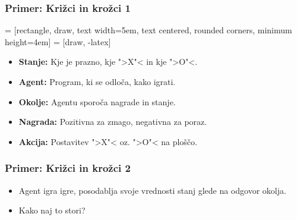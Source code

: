 \documentclass{beamer}    %
\begin{document}
\begin{frame}
    \frametitle{Primer: Križci in krožci 1}
     = [rectangle, draw, 
    text width=5em, text centered, rounded corners, minimum height=4em]
     = [draw, -latex]
    \begin{itemize}
        \item \textbf{Stanje:} Kje je prazno, kje ">X"< in kje ">O"<.
        \item \textbf{Agent:} Program, ki se odloča, kako igrati.
        \item \textbf{Okolje:} Agentu sporoča nagrade in stanje.
        \item \textbf{Nagrada:} Pozitivna za zmago, negativna za poraz.
        \item \textbf{Akcija:} Postavitev ">X"< oz. ">O"< na ploščo.
    \end{itemize}
\end{frame}


\begin{frame}
    \frametitle{Primer: Križci in krožci 2}
    \begin{itemize}
        \item Agent igra igre, posodablja svoje vrednosti stanj glede na odgovor okolja.
        \item Kako naj to stori?
    \end{itemize}
\end{frame}
\end{document}
